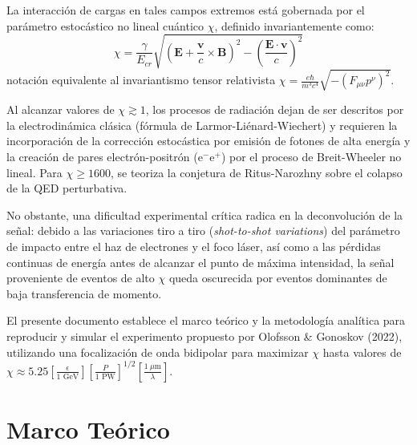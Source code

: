 \documentclass[twocolumn, 12pt]{article}
\begin{document}
La interacción de cargas en tales campos extremos está gobernada por el parámetro estocástico no lineal cuántico $\chi$, definido invariantemente como:
\begin{equation}
\chi = \frac{\gamma}{E_{cr}} \sqrt{\left( \mathbf{E} + \frac{\mathbf{v}}{c} \times \mathbf{B} \right)^2 - \left( \frac{\mathbf{E} \cdot \mathbf{v}}{c} \right)^2}
\end{equation}
notación equivalente al invariantismo tensor relativista $\chi = \frac{e\hbar}{m^3 c^4} \sqrt{-(F_{\mu\nu} p^\nu)^2}$.

Al alcanzar valores de $\chi \gtrsim 1$, los procesos de radiación dejan de ser descritos por la electrodinámica clásica (fórmula de Larmor-Liénard-Wiechert) y requieren la incorporación de la corrección estocástica por emisión de fotones de alta energía y la creación de pares electrón-positrón ($\text{e}^- \text{e}^+$) por el proceso de Breit-Wheeler no lineal. Para $\chi \ge 1600$, se teoriza la conjetura de Ritus-Narozhny sobre el colapso de la QED perturbativa.

No obstante, una dificultad experimental crítica radica en la deconvolución de la señal: debido a las variaciones tiro a tiro (\textit{shot-to-shot variations}) del parámetro de impacto entre el haz de electrones y el foco láser, así como a las pérdidas continuas de energía antes de alcanzar el punto de máxima intensidad, la señal proveniente de eventos de alto $\chi$ queda oscurecida por eventos dominantes de baja transferencia de momento.

El presente documento establece el marco teórico y la metodología analítica para reproducir y simular el experimento propuesto por Olofsson \& Gonoskov (2022), utilizando una focalización de onda bidipolar para maximizar $\chi$ hasta valores de $\chi \approx 5.25 \left[\frac{\epsilon}{1 \text{ GeV}}\right] \left[\frac{P}{1 \text{ PW}}\right]^{1/2} \left[\frac{1 \ \mu\text{m}}{\lambda}\right]$.

\section{Marco Teórico}
\end{document}
